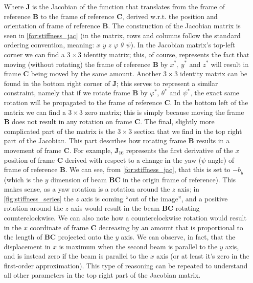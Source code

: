 \noindent
Where $\mathbf{J}$ is the Jacobian of the function that translates from the frame of reference
$\mathbf{B}$ to the frame of reference $\mathbf{C}$, derived w.r.t. the position and orientation
of frame of reference $\mathbf{B}$. The construction of the Jacobian matrix is seen
in \cref{for:stiffness_jac} (in the matrix, rows and columns follow the standard
ordering convention, meaning: $x$ $y$ $z$ $\varphi$ $\theta$ $\psi$).
In the Jacobian matrix's top-left corner we can find a $3 \times 3$ identity matrix; this, of course, represents the fact that moving (without rotating) the frame of reference
$\mathbf{B}$ by $x^*$, $y^*$ and $z^*$ will result in frame $\mathbf{C}$ being
moved by the same amount.
Another $3 \times 3$ identity matrix can be found in the bottom right corner of $\mathbf{J}$;
this serves to represent a similar constraint, namely that if we rotate frame $\mathbf{B}$
by $\varphi^*$, $\theta^*$ and $\psi^*$, the exact same rotation will be propagated
to the frame of reference $\mathbf{C}$.
In the bottom left of the matrix we can find a $3 \times 3$ zero matrix; this is simply
because moving the frame $\mathbf{B}$ does not result in any rotation on frame $\mathbf{C}$.
The final, slightly more complicated part of the matrix is the $3 \times 3$ section that
we find in the top right part of the Jacobian. This part describes how rotating
frame $\mathbf{B}$ results in a movement of frame $\mathbf{C}$.
For example, $\mathbf{J}_{16}$ represents the first derivative of the $x$ position
of frame $\mathbf{C}$ derived with respect to a change in the yaw ($\psi$ angle)
of frame of reference $\mathbf{B}$. We can see, from \cref{for:stiffness_jac},
that this is set to $-b_y$ (which is the $y$ dimension of beam $\mathbf{BC}$ in the origin
frame of reference). This makes sense, as a yaw rotation is a rotation around the $z$ axis;
in \cref{fig:stiffness_series} the $z$ axis is coming ``out of the image'', and a positive
rotation around the $z$ axis would result in the beam $\mathbf{BC}$ rotating counterclockwise.
We can also note how a counterclockwise rotation would result in the $x$ coordinate of frame $\mathbf{C}$
decreasing by an amount that is proportional to the length of $\mathbf{BC}$ projected onto the $y$ axis.
We can observe, in fact, that the displacement in $x$ is maximum when the second beam is parallel to the $y$ axis,
and is instead zero if the beam is parallel to the $x$ axis (or at least it's zero in the first-order approximation).
This type of reasoning can be repeated to understand all other parameters in the top right part of the
Jacobian matrix.

